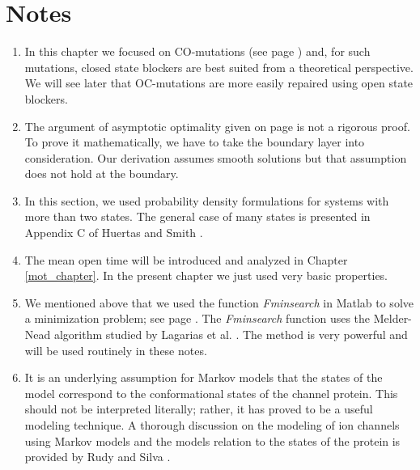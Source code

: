 \clearpage

\section{Notes \label{notesdrugs}}

\begin{enumerate}
\item In this chapter we focused on CO-mutations (see page \pageref{com}) and, for such mutations, closed state blockers are best suited from a theoretical perspective. We will see later that OC-mutations are more easily repaired using open state blockers.
\item The argument of asymptotic optimality given on page \pageref{asymptotic} is not a rigorous proof. To prove it mathematically, we have to take the boundary layer into consideration. Our derivation assumes smooth solutions but that assumption does not hold at the boundary.
\item In this section, we used probability density formulations for systems with more than two states. The general  case of many states is presented in Appendix C of  Huertas and Smith \cite{Huertas2007}.
\item The mean open time will be introduced and analyzed in Chapter \ref{mot_chapter}. In the present chapter we just used very basic properties.
\item We mentioned above that we used the function \textit{Fminsearch} in Matlab to solve a minimization problem; see page  \pageref{Fminsearch}. The \textit{Fminsearch} function uses the Melder-Nead \cite{Nelder1965} algorithm studied by Lagarias et al. \cite{Lagarias1998}. The method is very powerful and will be used routinely in these notes. 
\item It is an underlying assumption for Markov models that the states of the model correspond to the conformational states of the channel protein. This should not be interpreted literally; rather, it has proved to be a useful modeling technique. A thorough discussion on the modeling of ion channels using Markov models and the models relation to the states of the protein is provided by Rudy and Silva \cite{Rudy2006}.
\end{enumerate}


